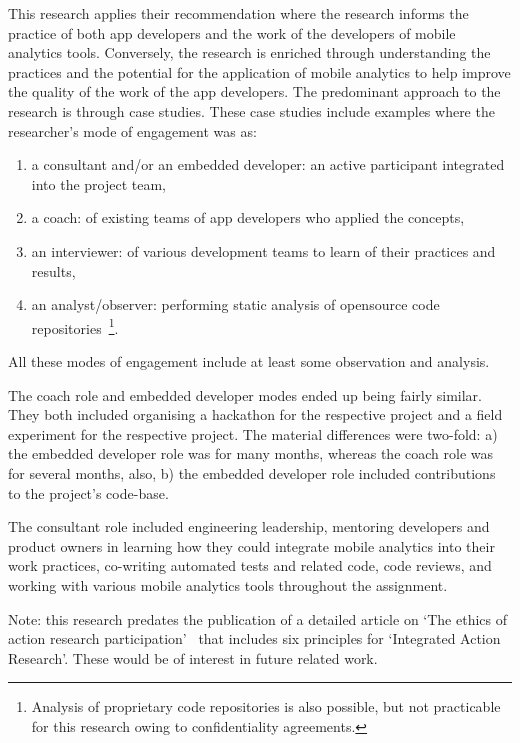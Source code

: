 This research applies their recommendation where the research informs the practice of both app developers and the work of the developers of mobile analytics tools. Conversely, the research is enriched through understanding the practices and the potential for the application of mobile analytics to help improve the quality of the work of the app developers. The predominant approach to the research is through case studies. These case studies include examples where the researcher's mode of engagement was as:
\begin{enumerate}
    \itemsep0em
    \item a consultant and/or an embedded developer: an active participant integrated into the project team,
    \item a coach: of existing teams of app developers who applied the concepts,
    \item an interviewer: of various development teams to learn of their practices and results,
    \item an analyst/observer: performing static analysis of opensource code repositories~\footnote{Analysis of proprietary code repositories is also possible, but not practicable for this research owing to confidentiality agreements.}.
\end{enumerate}

All these modes of engagement include at least some observation and analysis. 

The coach role and embedded developer modes ended up being fairly similar. They both included organising a hackathon for the respective project and a field experiment for the respective project. The material differences were two-fold: a) the embedded developer role was for many months, whereas the coach role was for several months, also, b) the embedded developer role included contributions to the project's code-base. 

The consultant role included engineering leadership, mentoring developers and product owners in learning how they could integrate mobile analytics into their work practices, co-writing automated tests and related code, code reviews, and working with various mobile analytics tools throughout the assignment.

Note: this research predates the publication of a detailed article on `The ethics of action research participation'~\citep{davison2021_the_ethics_of_action_research_participation} that includes six principles for `Integrated Action Research'. These would be of interest in future related work.

